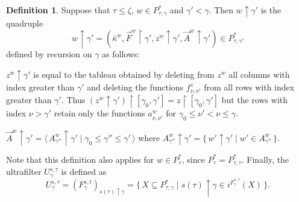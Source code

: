 \documentclass[
twoside,
]{article}
\theoremstyle{definition}
\newtheorem{definition}[theorem]{Definition}
\theoremstyle{remark}
\newcommand{\ufFromExt}[2]{(#1)_{#2}}
\newcommand{\forceKappa}{\bar\kappa} %
\newcommand{\scutdown}{{\uparrow}}
\newcommand{\set}[1]{\{\,#1\,\}}
\newcommand{\pair}[1]{\langle#1\rangle}
\newcommand{\seq}[1]{\pair{\,#1\,}}
\newcommand{\restrict}{{\upharpoonright}}
\begin{document}
\begin{definition}
Suppose that $\tau\leq\zeta$, $w\in P^*_{\tau,\gamma}$ and $\gamma'<\gamma$.  Then
$w\scutdown\gamma'$ is the quadruple
\begin{equation*}
w\scutdown\gamma'=(\forceKappa^{w},\vec
F^{w}\restrict\gamma', z^{w}\scutdown\gamma',\vec A^{w}\scutdown\gamma')\in
P^*_{\tau,\gamma'}
\end{equation*}
defined by recursion on $\gamma$ as follows:
\begin{compactenum}
\item $z^{w}\scutdown\gamma'$ is equal to the tableau obtained by
  deleting from $z^{w}$ all columns with index greater than $\gamma'$ and
  deleting the functions $f^{z}_{\nu,\nu'}$ from all rows with index
  greater than $\gamma'$.  Thus
  $(z^{w}\scutdown\gamma')\restrict[\gamma_0,\gamma']=z\restrict[\gamma_0,\gamma']$
  but the rows with index $\nu>\gamma'$ retain only the
  functions  $a^{w}_{\nu,\nu'}$ for $\gamma_0\leq\nu'<\nu\leq\gamma$.
\item
  $\vec
  A^{w}\scutdown\gamma'=\seq{A^{w}_{\gamma''}\scutdown\gamma'\mid
    \gamma_0\leq\gamma''\leq\gamma'}$ where
  $A^{w}_{\gamma''}\scutdown\gamma'=\set{w'\scutdown\gamma'\mid w'\in A^{w}_{\gamma''}}$.
\end{compactenum}
Note that this  definition  also applies for  $w\in P_{\tau}^*$, since
$P^*_{\tau}=P^*_{\tau,\tau}$. 
Finally, the ultrafilter $U^{s,\tau}_{\gamma}$ is defined as
\begin{equation}\label{eq:n}
  U^{s,\tau}_{\gamma}=\ufFromExt{F^{s,t}_{\gamma}}{s(\tau)\scutdown\gamma}=\set{X\subseteq P^*_{\tau,\gamma}\mid
    s(\tau)\scutdown\gamma\in i^{F^{s,\tau}_{\gamma}}(X)}.
\end{equation}

\end{definition}
\end{document}
